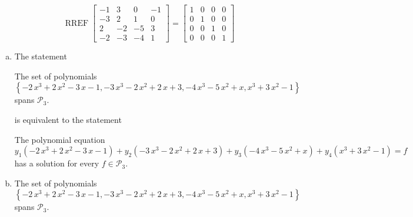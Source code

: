 \begin{exerciseAnswer} 


\[\operatorname{RREF} \left[\begin{array}{cccc}
-1 & 3 & 0 & -1 \\
-3 & 2 & 1 & 0 \\
2 & -2 & -5 & 3 \\
-2 & -3 & -4 & 1
\end{array}\right] = \left[\begin{array}{cccc}
1 & 0 & 0 & 0 \\
0 & 1 & 0 & 0 \\
0 & 0 & 1 & 0 \\
0 & 0 & 0 & 1
\end{array}\right] \]


\begin{enumerate}[(a)]
\item The statement 
\begin{center}\begin{minipage}{0.8\textwidth}
 The set of polynomials \( \left\{ -2 \, x^{3} + 2 \, x^{2} - 3 \, x - 1 , -3 \, x^{3} - 2 \, x^{2} + 2 \, x + 3 , -4 \, x^{3} - 5 \, x^{2} + x , x^{3} + 3 \, x^{2} - 1 \right\} \) spans \(\mathcal{P}_3\). 
\end{minipage}\end{center}
     is equivalent to the statement 
\begin{center}\begin{minipage}{0.8\textwidth}
 The polynomial equation \[ y_{1} \left( -2 \, x^{3} + 2 \, x^{2} - 3 \, x - 1 \right) + y_{2} \left( -3 \, x^{3} - 2 \, x^{2} + 2 \, x + 3 \right) + y_{3} \left( -4 \, x^{3} - 5 \, x^{2} + x \right) + y_{4} \left( x^{3} + 3 \, x^{2} - 1 \right) =f\] has a solution for every \(f \in \mathcal{P}_3\). 
\end{minipage}\end{center}
    
\item The set of polynomials \( \left\{ -2 \, x^{3} + 2 \, x^{2} - 3 \, x - 1 , -3 \, x^{3} - 2 \, x^{2} + 2 \, x + 3 , -4 \, x^{3} - 5 \, x^{2} + x , x^{3} + 3 \, x^{2} - 1 \right\} \) spans \(\mathcal{P}_3\). 
\end{enumerate}
    
\end{exerciseAnswer}
    
